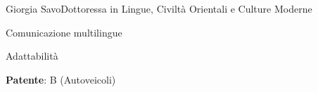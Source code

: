 \documentclass{article}
\begin{document}
\begin{cv}[avatar]{Giorgia Savo}{Dottoressa in Lingue, Civiltà Orientali e Culture Moderne}

\begin{cvitem}
    Comunicazione multilingue
\end{cvitem}

\cvseparator
\begin{cvitem}
    Adattabilità
\end{cvitem}


\begin{cvitem}
	\textbf{Patente}: B (Autoveicoli)
\end{cvitem}


\end{cv}

\end{document}
